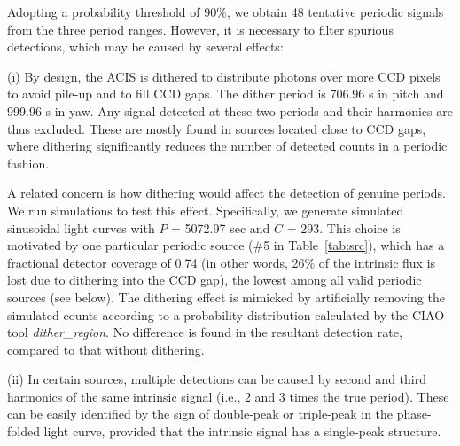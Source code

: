 \documentclass[fleqn,usenatbib]{mnras}
\begin{document}
Adopting a probability threshold of 90\%, we obtain 48 tentative periodic signals from the three period ranges. However, it is necessary to filter spurious detections, which may be caused by several effects:

(i) By design, the ACIS is dithered to distribute photons over more CCD pixels to avoid pile-up and to fill CCD gaps. The dither period is 706.96 s in pitch and 999.96 s in yaw. Any signal detected at these two periods and their harmonics are thus excluded. These are mostly found in sources located close to CCD gaps, where dithering significantly reduces the number of detected counts in a periodic fashion. 

A related concern is how dithering would affect the detection of genuine periods.  
We run simulations to test this effect. Specifically, we generate simulated sinusoidal light curves with $P$ = 5072.97 sec and $C$ = 293. 
This choice is motivated by one particular periodic source (\#5 in Table~\ref{tab:src}), which has a fractional detector coverage of 0.74 (in other words, 26\% of the intrinsic flux is lost due to dithering into the CCD gap), the lowest among all valid periodic sources (see below). The dithering effect is mimicked by artificially removing the simulated counts according to a probability distribution calculated by the CIAO tool \emph{dither\_region}. 
No difference is found in the resultant detection rate, compared to that without dithering. 

(ii) In certain sources, multiple detections can be caused by second and third harmonics of the same intrinsic signal (i.e., 2 and 3 times the true period). These can be easily identified by the sign of double-peak or triple-peak in the phase-folded light curve, provided that the intrinsic signal has a single-peak structure. 
\end{document}

